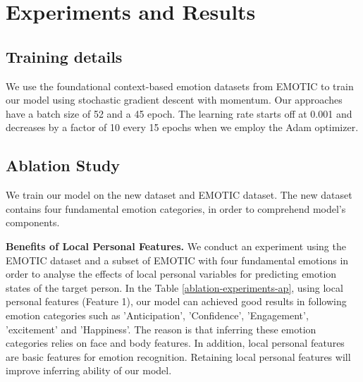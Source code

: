 \documentclass[conference]{IEEEtran}
\begin{document}
\section{Experiments and Results}
\subsection{Training details}
We use the foundational context-based emotion datasets from EMOTIC to train our model using stochastic gradient descent with momentum. Our approaches have a batch size of 52 and a 45 epoch. The learning rate starts off at 0.001 and decreases by a factor of 10 every 15 epochs when we employ the Adam optimizer.

\subsection{Ablation Study}

We train our model on the new dataset and EMOTIC dataset. The new dataset contains four fundamental emotion categories, in order to comprehend model's components.

\textbf{Benefits of Local Personal Features.} We conduct an experiment using the EMOTIC dataset and a subset of EMOTIC with four fundamental emotions in order to analyse the effects of local personal variables for predicting emotion states of the target person. In the Table \ref{ablation-experiments-ap}, using local personal features (Feature 1), our model can achieved good results in following emotion categories such as 'Anticipation', 'Confidence', 'Engagement', 'excitement' and 'Happiness'. The reason is that inferring these emotion categories relies on face and body features. In addition, local personal features are basic features for emotion recognition. Retaining local personal features will improve inferring ability of our model. 
\end{document}
